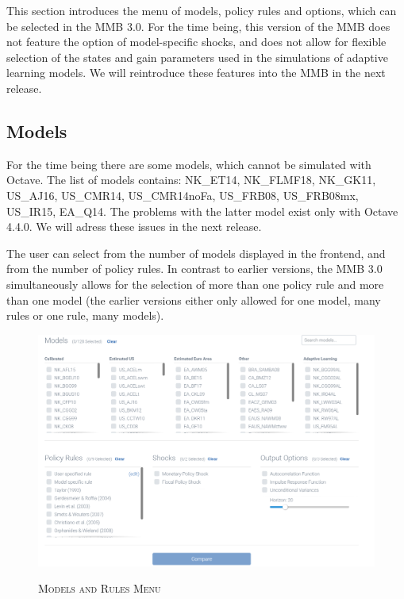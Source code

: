 This section introduces the menu of models, policy rules and options, which can be selected in the MMB 3.0. For the time being, this version of the MMB does not feature the option of  model-specific shocks, and does not allow for flexible selection of the states and gain parameters used in the simulations of adaptive learning models. We will reintroduce these features into the MMB in the next release. 
\subsection*{Models}
For the time being there are some models, which cannot be simulated with Octave. The list of models contains: NK\_ET14, NK\_FLMF18, NK\_GK11, US\_AJ16, US\_CMR14, US\_CMR14noFa, US\_FRB08, US\_FRB08mx, US\_IR15, EA\_Q14. The problems with the latter model exist only with Octave 4.4.0. We will adress these issues in the next release.

The user can select from the number of models displayed in the frontend, and from the number of policy rules. In contrast to earlier versions, the MMB 3.0 simultaneously allows for the selection of more than one policy rule and more than one model (the earlier versions either only allowed for one model, many rules or one rule, many models). 

\begin{figure}[H]
	\centering
	\caption{\textsc{Models and Rules Menu}}
	\vspace{0.2cm}
	\includegraphics[width=15cm,keepaspectratio]{frontend.png}\\
	\label{img:Models}
\end{figure}

